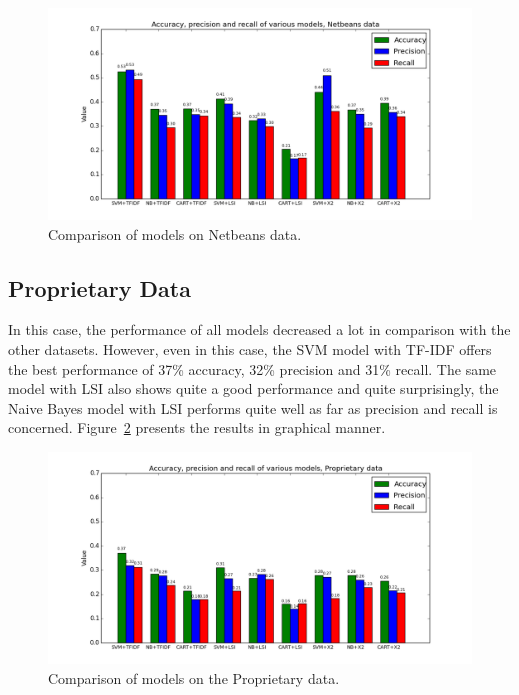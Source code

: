 \begin{figure}[htbp]
    \centering
        \includegraphics[width=\textwidth]{./images/comparison_of_models/netbeans.png}
    \caption{Comparison of models on Netbeans data.}
    \label{fig:results.models.netbeans}
\end{figure}

\subsection{Proprietary Data}

In this case, the performance of all models decreased a lot in comparison with the other datasets. However, even in this case, the SVM model with TF-IDF offers the best performance of 37\% accuracy, 32\% precision and 31\% recall. The same model with LSI also shows quite a good performance and quite surprisingly, the Naive Bayes model with LSI performs quite well as far as precision and recall is concerned. Figure~\ref{fig:results.models.proprietary} presents the results in graphical manner.

\begin{figure}[htbp]
    \centering
        \includegraphics[width=\textwidth]{./images/comparison_of_models/proprietary.png}
    \caption{Comparison of models on the Proprietary data.}
    \label{fig:results.models.proprietary}
\end{figure}

